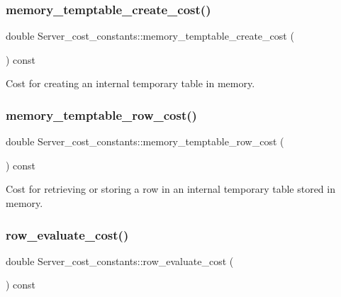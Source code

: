 \subsubsection{\texorpdfstring{memory\+\_\+temptable\+\_\+create\+\_\+cost()}{memory\_temptable\_create\_cost()}}
{\footnotesize\ttfamily double Server\+\_\+cost\+\_\+constants\+::memory\+\_\+temptable\+\_\+create\+\_\+cost (\begin{DoxyParamCaption}{ }\end{DoxyParamCaption}) const\hspace{0.3cm}{\ttfamily [inline]}}

Cost for creating an internal temporary table in memory. \mbox{\label{classServer__cost__constants_a9de227818ce128b4f0dfc64d997f48df}} 
\subsubsection{\texorpdfstring{memory\+\_\+temptable\+\_\+row\+\_\+cost()}{memory\_temptable\_row\_cost()}}
{\footnotesize\ttfamily double Server\+\_\+cost\+\_\+constants\+::memory\+\_\+temptable\+\_\+row\+\_\+cost (\begin{DoxyParamCaption}{ }\end{DoxyParamCaption}) const\hspace{0.3cm}{\ttfamily [inline]}}

Cost for retrieving or storing a row in an internal temporary table stored in memory. \mbox{\label{classServer__cost__constants_a0e8899c1b50ebe6a35a5bc4607c2eeef}} 
\subsubsection{\texorpdfstring{row\+\_\+evaluate\+\_\+cost()}{row\_evaluate\_cost()}}
{\footnotesize\ttfamily double Server\+\_\+cost\+\_\+constants\+::row\+\_\+evaluate\+\_\+cost (\begin{DoxyParamCaption}{ }\end{DoxyParamCaption}) const\hspace{0.3cm}{\ttfamily [inline]}}

